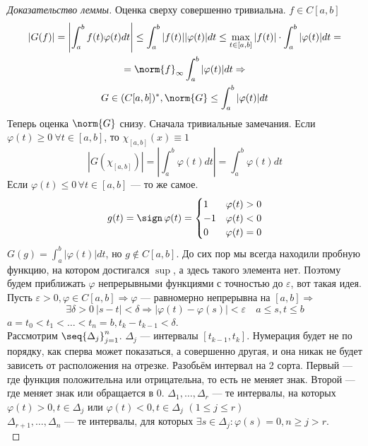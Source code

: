 \documentclass[document]{subfiles}
\begin{document}
\begin{proof}[Доказательство леммы]
    Оценка сверху совершенно тривиальна.
    $f \in C[a,b]$
    \begin{multline*}
        |G(f)| = \left| \int^b_a f(t) \varphi(t) dt \right| \leq \int^b_a |f(t)| |\varphi(t)| dt \leq \max_{t \in [a,b]} |f(t)| \cdot \int^b_a |\varphi(t)| dt = \\ =
        \norm{f}_\infty \int^b_a |\varphi(t)| dt \Rightarrow \\
        G \in (C[a,b])^*, \norm{G} \leq \int^b_a |\varphi(t)| dt
    \end{multline*}
    Теперь оценка $\norm{G}$ снизу. Сначала тривиальные замечания. Если $\varphi(t) \geq 0 \: \forall t \in [a,b]$, то $\chi_{[a,b]}(x) \equiv 1$
    \[ |G(\chi_[a,b])| = \left| \int^b_a \varphi(t) dt \right| = \int^b_a \varphi(t) dt \]
    Если $\varphi(t) \leq 0 \, \forall t \in [a,b]$ --- то же самое.
    \[ g(t) = \sign \, \varphi(t) = \begin{cases}
        1 & \varphi(t) > 0 \\
        -1 & \varphi(t) < 0 \\
        0 &\varphi(t) = 0
    \end{cases} \]
    $G(g) = \int^b_a |\varphi(t)| dt$, но $g \notin C[a,b]$.
    До сих пор мы всегда находили пробную функцию, на котором достигался $\sup$, а здесь такого элемента нет.
    Поэтому будем приближать $\varphi$ непрерывными функциями  с точностью до $\varepsilon$, вот такая идея. \\
    Пусть $\varepsilon > 0, \varphi \in C[a,b] \Rightarrow \varphi$ --- равномерно непрерывна на $[a,b] \Rightarrow$
    \[ \exists \delta > 0 \: |s-t| < \delta \Rightarrow |\varphi(t) - \varphi(s)| < \varepsilon \quad a \leq s, t \leq b \]
    $a = t_0 < t_1 < \ldots < t_n = b, t_k - t_{k-1} < \delta$. \\
    Рассмотрим $\seq{\Delta_j}^n_{j=1}$. $\Delta_j$ --- интервалы $[t_{k-1}, t_k]$.
    Нумерация будет не по порядку, как сперва может показаться, а совершенно другая, и она никак не будет зависеть от расположения на отрезке.
     Разобьём интервал на 2 сорта. Первый --- где функция положительна или отрицательна, то есть не меняет знак. Второй --- где меняет знак или обращается в 0.
    $\Delta_1, \ldots, \Delta_r$ --- те интервалы, на которых $\varphi(t) > 0, t \in \Delta_j$ или $\varphi(t) < 0, t \in \Delta_j$ $(1 \leq j \leq r)$ \\
    $\Delta_{r+1}, \ldots, \Delta_n$ --- те интервалы, для которых $\exists s \in \Delta_j : \varphi(s) = 0, n \geq j > r$. \\

\end{proof}
\end{document}
